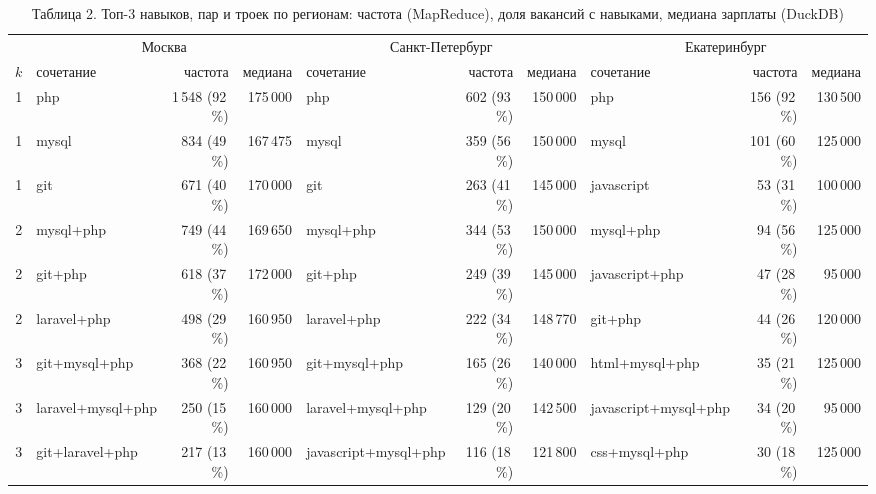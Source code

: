 \documentclass[11pt,a4paper]{article}
\begin{document}
\begin{table}[H]
\centering
\scriptsize
\setlength{\tabcolsep}{3pt}
\caption{Таблица 2. Топ-3 навыков, пар и троек по регионам: частота (MapReduce), доля вакансий с навыками, медиана зарплаты (DuckDB)}
\begin{tabular}{@{}clrr|lrr|lrr@{}}
\toprule
 & \multicolumn{3}{c|}{Москва} & \multicolumn{3}{c|}{Санкт-Петербург} & \multicolumn{3}{c}{Екатеринбург} \\
$k$ & сочетание & частота & медиана & сочетание & частота & медиана & сочетание & частота & медиана \\
\midrule
1 & php & 1\,548 (92\,\%) & 175\,000 & php & 602 (93\,\%) & 150\,000 & php & 156 (92\,\%) & 130\,500 \\
1 & mysql & 834 (49\,\%) & 167\,475 & mysql & 359 (56\,\%) & 150\,000 & mysql & 101 (60\,\%) & 125\,000 \\
1 & git & 671 (40\,\%) & 170\,000 & git & 263 (41\,\%) & 145\,000 & javascript & 53 (31\,\%) & 100\,000 \\
\midrule
2 & mysql+php & 749 (44\,\%) & 169\,650 & mysql+php & 344 (53\,\%) & 150\,000 & mysql+php & 94 (56\,\%) & 125\,000 \\
2 & git+php & 618 (37\,\%) & 172\,000 & git+php & 249 (39\,\%) & 145\,000 & javascript+php & 47 (28\,\%) & 95\,000 \\
2 & laravel+php & 498 (29\,\%) & 160\,950 & laravel+php & 222 (34\,\%) & 148\,770 & git+php & 44 (26\,\%) & 120\,000 \\
\midrule
3 & git+mysql+php & 368 (22\,\%) & 160\,950 & git+mysql+php & 165 (26\,\%) & 140\,000 & html+mysql+php & 35 (21\,\%) & 125\,000 \\
3 & laravel+mysql+php & 250 (15\,\%) & 160\,000 & laravel+mysql+php & 129 (20\,\%) & 142\,500 & javascript+mysql+php & 34 (20\,\%) & 95\,000 \\
3 & git+laravel+php & 217 (13\,\%) & 160\,000 & javascript+mysql+php & 116 (18\,\%) & 121\,800 & css+mysql+php & 30 (18\,\%) & 125\,000 \\
\bottomrule
\end{tabular}
\end{table}
\end{document}
